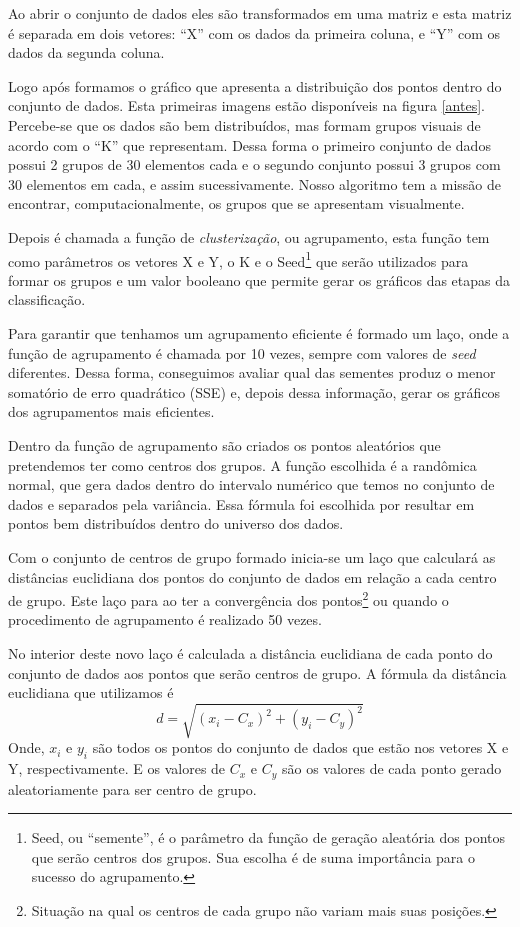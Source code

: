 \documentclass[12pt, a4paper]{article}
\begin{document}
Ao abrir o conjunto de dados eles são transformados em uma matriz e esta matriz é separada em dois vetores: ``X'' com os dados da primeira coluna, e ``Y'' com os dados da segunda coluna.

Logo após formamos o gráfico que apresenta a distribuição dos pontos dentro do conjunto de dados. Esta primeiras imagens estão disponíveis na figura \ref{antes}. Percebe-se que os dados são bem distribuídos, mas formam grupos visuais de acordo com o ``K'' que representam. Dessa forma o primeiro conjunto de dados possui 2 grupos de 30 elementos cada e o segundo conjunto possui 3 grupos com 30 elementos em cada, e assim sucessivamente. Nosso algoritmo tem a missão de encontrar, computacionalmente, os grupos que se apresentam visualmente.

Depois é chamada a função de \textit{clusterização}, ou agrupamento, esta função tem como parâmetros os vetores X e Y, o K e o Seed\footnote{Seed, ou ``semente'', é o parâmetro da função de geração aleatória dos pontos que serão centros dos grupos. Sua escolha é de suma importância para o sucesso do agrupamento.} que serão utilizados para formar os grupos e um valor booleano que permite gerar os gráficos das etapas da classificação.

Para garantir que tenhamos um agrupamento eficiente é formado um laço, onde a função de agrupamento é chamada por 10 vezes, sempre com valores de \textit{seed} diferentes. Dessa forma, conseguimos avaliar qual das sementes produz o menor somatório de erro quadrático (SSE) e, depois dessa informação, gerar os gráficos dos agrupamentos mais eficientes.

Dentro da função de agrupamento são criados os pontos aleatórios que pretendemos ter como centros dos grupos. A função escolhida é a randômica normal, que gera dados dentro do intervalo numérico que temos no conjunto de dados e separados pela variância. Essa fórmula foi escolhida por resultar em pontos bem distribuídos dentro do universo dos dados.

Com o conjunto de centros de grupo formado inicia-se um laço que calculará as distâncias euclidiana dos pontos do conjunto de dados em relação a cada centro de grupo. Este laço para ao ter a convergência dos pontos\footnote{Situação na qual os centros de cada grupo não variam mais suas posições.} ou quando o procedimento de agrupamento é realizado 50 vezes.

No interior deste novo laço é calculada a distância euclidiana de cada ponto do conjunto de dados aos pontos que serão centros de grupo. A fórmula da distância euclidiana que utilizamos é $$d = \sqrt{(x_i - C_x)^2+(y_i - C_y)^2}$$ Onde, $x_i$ e $y_i$ são todos os pontos do conjunto de dados que estão nos vetores X e Y, respectivamente. E os valores de $C_x$ e $C_y$ são os valores de cada ponto gerado aleatoriamente para ser centro de grupo.
\end{document}
